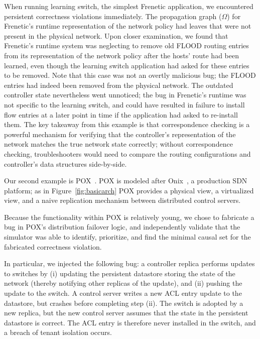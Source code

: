 {When running learning switch, the simplest Frenetic application, we encountered
persistent correctness violations immediately. The propagation graph ($\Omega$) for Frenetic's
runtime representation of the network policy had leaves that were not present
in the physical network. Upon closer examination, we found that Frenetic's
runtime system was neglecting to remove old FLOOD routing entries from its
representation of the network policy after the hosts' route had been learned,
even though the learning switch application had
asked for these entries to be removed. Note that this case was not an overtly
malicious bug; the FLOOD entries had indeed been removed from the physical
network. The outdated controller state nevertheless went unnoticed; the bug in
Frenetic's runtime was not specific to the learning switch, and could have
resulted in failure to install flow entries at a later point in time if the
application had asked to re-install them. The key takeaway from this example
is that correspondence checking is a powerful mechanism for
verifying that the controller's representation of the network matches the true
network state correctly; without correspondence checking, troubleshooters
would need to compare the routing configurations and controller's data
structures side-by-side.

 Our second example is POX~\cite{pox}. POX is modeled after
Onix~\cite{onix}, a production SDN platform; as in Figure~\ref{fig:basicarch}
POX provides a physical view, a virtualized view, and a naive replication
mechanism between distributed control servers.

Because the functionality within POX is relatively young, we chose to
fabricate a bug in POX's distribution failover logic, and independently
validate that the simulator was able to identify, prioritize, and find the
minimal causal set for the fabricated correctness violation.

In particular, we injected the following bug: a controller replica performs
updates to switches by (i) updating the persistent datastore storing the state
of the network (thereby notifying other replicas of the update), and (ii) pushing the
update to the switch. A control server writes a new ACL entry update to the datastore, but crashes
before completing step (ii). The switch is adopted by a new replica,
but the new control server assumes that the state in the persistent datastore
is correct. The ACL entry is therefore never installed in the switch, and a
breach of tenant isolation occurs.

}
